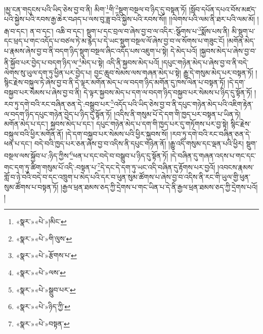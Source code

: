 །མྱ་ངན་གདུངས་པའི་ཡིད་ཅེས་བྱ་བ་ནི། མིག་\footnote{«སྣར་»«པེ་»།མིང་}གི་\footnote{«སྣར་»«པེ་»གི་ལུས་}སྡུག་བསྔལ་བ་ཉིད་དུ་བསྟན་ཏོ། །སློབ་དཔོན་དཔའ་བོས་མཛད་པའི་སྐྱེས་པའི་རབས་རྒྱ་ཆེར་བཤད་པ་ལས་བུ་ཟླ་བའི་སྐྱེས་པའི་རབས་སོ།། །།ལེགས་པའི་ལམ་ནི་ཐར་པའི་ལམ་མོ། །རྒ་བ་དང་། ན་བ་དང་། འཆི་བ་དང་། སྡུག་པ་དང་བྲལ་བ་ཞེས་བྱ་བ་ལ་འདིར་:སྩོགས་པ་\footnote{«སྣར་»«པེ་»རྩོགས་པ་}སྨོས་པས་ནི། མི་སྡུག་པ་དང་ཕྲད་པ་གང་འདོད་པ་བཙལ་ཏེ་མ་རྙེད་པ་དེ་ཡང་སྡུག་བསྔལ་ལོ་ཞེས་བྱ་བ་ལ་སོགས་པ་གཟུང་ངོ། །མགོན་མེད་པ་རྣམས་ཞེས་བྱ་བ་ནི་བདག་ཉིད་སྡུག་བསྔལ་ཞིང་འདོད་པས་འཇུག་པ་སྟེ། དེ་མེད་པའོ། །སྐྱབས་མེད་པ་ཞེས་བྱ་བ་ནི་སྐྱོབ་པར་བྱེད་པ་བདག་ཉིད་ལ་\footnote{«སྣར་»«པེ་»ལས་}མེད་པ་སྟེ། འདི་ནི་སྐྱབས་མེད་པའོ། །དཔུང་གཉེན་མེད་པ་ཞེས་བྱ་བ་ནི་བདེ་ལེགས་སུ་ཡུལ་དག་ཏུ་ཕྱིན་པར་བྱེད་པ། བྱང་ཆུབ་སེམས་ལས་གཞན་མེད་པ་སྟེ། རྒྱུ་དེ་གསུམ་མེད་པར་བསྟན་ཏོ། །སྙིང་རྗེས་བསྐུལ་ཏེ་ཞེས་བྱ་བ་ནི་དེ་ལྟར་མགོན་མེད་པ་ལ་བདག་ཉིད་མགོན་དུ་ཁས་ལེན་པ་བསྟན་ཏོ། །དེ་དག་བསྐྱབ་པར་སེམས་པ་ཞེས་བྱ་བ་ནི། དེ་ལྟར་སྐྱབས་མེད་པ་དག་ལ་བདག་ཉིད་བསྐྱབ་པར་སེམས་པ་ཉིད་དུ་སྟོན་ཏོ། །རབ་ཏུ་དགེ་བའི་རང་བཞིན་ཅན་དེ་:བསྒྲུབ་པར་\footnote{«སྣར་»«པེ་»སྒྲུབ་པར་}འདོད་པའི་ཡིད་ཅེས་བྱ་བ་ནི་དཔུང་གཉེན་མེད་པའི་འཇིག་རྟེན་ལ་བདག་ཉིད་དཔུང་གཉེན་བྱེད་པ་ཉིད་དུ་སྟོན་ཏོ། །འདིས་ནི་གསུམ་པོ་དེ་དག་གི་ཁྱད་པར་བསྟན་པ་ཡིན་ཏེ། མགོན་མེད་པ་དང་། སྐྱབས་མེད་པ་དང་། དཔུང་གཉེན་མེད་པ་དག་གི་ཁྱད་པར་དུ་གཏོགས་པར་བྱ་སྟེ། སྙིང་རྗེས་བསྐུལ་བའི་ཕྱིར་མགོན་ནོ། །དེ་དག་བསྐྱབ་པར་སེམས་པའི་ཕྱིར་སྐྱབས་སོ། །རབ་ཏུ་དགེ་བའི་རང་བཞིན་ཅན་དེ་ཕན་པ་དང་། བདེ་བའི་ཁྱད་པར་ཅན་ཞེས་བྱ་བ་འདིས་ནི་དཔུང་གཉེན་ནོ། །རྒྱུ་འདི་གསུམ་དང་ལྡན་པའི་ཕྱིར། སྡུག་བསྔལ་ལས་སྐྱོབ་པ་:ཉིད་ཀྱིས་\footnote{«སྣར་»«པེ་»ཉིད་ཀྱི་}ཕན་པ་དང་བདེ་བ་བསྒྲུབ་པ་ཉིད་དུ་སྟོན་ཏོ། །དེ་བཞིན་དུ་གཞན་འདས་པ་གང་དང་གང་དག་ཏུ་ཚིག་གསུམ་པོ་འདི་:བསྟན་པ་\footnote{«སྣར་»«པེ་»བསྟན་}དེ་དང་དེ་དག་ཏུ་ཡང་འདི་བཞིན་དུ་རྟོགས་པར་བྱའོ། །འབངས་རྣམས་གློ་བ་ཉེ་བའི་བདེ་བ་དང་འཁྲུག་པ་མེད་པའི་དར་བ་ཕུན་སུམ་ཚོགས་པ་ཞེས་བྱ་བ་འདིས་ནི་རང་གི་ཡུལ་གྱི་ཕུན་སུམ་ཚོགས་པ་བསྟན་ཏོ། །རྒྱལ་ཕྲན་ཐམས་ཅད་ཀྱི་དྲེགས་པ་གང་ཡིན་པ་དེ་ནི་རྒྱལ་ཕྲན་ཐམས་ཅད་ཀྱི་དྲེགས་པའོ། །
